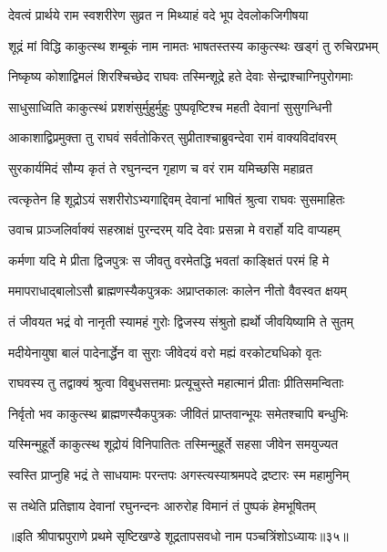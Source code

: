\twolineshloka
{देवत्वं प्रार्थये राम स्वशरीरेण सुव्रत}
{न मिथ्याहं वदे भूप देवलोकजिगीषया}%

\twolineshloka
{शूद्रं मां विद्धि काकुत्स्थ शम्बूकं नाम नामतः}
{भाषतस्तस्य काकुत्स्थः खड्गं तु रुचिरप्रभम्}%

\twolineshloka
{निष्कृष्य कोशाद्विमलं शिरश्चिच्छेद राघवः}
{तस्मिन्शूद्रे हते देवाः सेन्द्राश्चाग्निपुरोगमाः}%

\twolineshloka
{साधुसाध्विति काकुत्स्थं प्रशशंसुर्मुहुर्मुहुः}
{पुष्पवृष्टिश्च महती देवानां सुसुगन्धिनी}%

\twolineshloka
{आकाशाद्विप्रमुक्ता तु राघवं सर्वतोकिरत्}
{सुप्रीताश्चाब्रुवन्देवा रामं वाक्यविदांवरम्}%

\twolineshloka
{सुरकार्यमिदं सौम्य कृतं ते रघुनन्दन}
{गृहाण च वरं राम यमिच्छसि महाव्रत}%

\twolineshloka
{त्वत्कृतेन हि शूद्रोऽयं सशरीरोऽभ्यगाद्दिवम्}
{देवानां भाषितं श्रुत्वा राघवः सुसमाहितः}%

\twolineshloka
{उवाच प्राञ्जलिर्वाक्यं सहस्राक्षं पुरन्दरम्}
{यदि देवाः प्रसन्ना मे वरार्हो यदि वाप्यहम्}%

\twolineshloka
{कर्मणा यदि मे प्रीता द्विजपुत्रः स जीवतु}
{वरमेतद्धि भवतां काङ्क्षितं परमं हि मे}%

\twolineshloka
{ममापराधाद्बालोऽसौ ब्राह्मणस्यैकपुत्रकः}
{अप्राप्तकालः कालेन नीतो वैवस्वत क्षयम्}%

\twolineshloka
{तं जीवयत भद्रं वो नानृती स्यामहं गुरोः}
{द्विजस्य संश्रुतो ह्यर्थो जीवयिष्यामि ते सुतम्}%

\twolineshloka
{मदीयेनायुषा बालं पादेनार्द्धेन वा सुराः}
{जीवेदयं वरो मह्यं वरकोट्यधिको वृतः}%

\twolineshloka
{राघवस्य तु तद्वाक्यं श्रुत्वा विबुधसत्तमाः}
{प्रत्यूचुस्ते महात्मानं प्रीताः प्रीतिसमन्विताः}%

\twolineshloka
{निर्वृतो भव काकुत्स्थ ब्राह्मणस्यैकपुत्रकः}
{जीवितं प्राप्तवान्भूयः समेतश्चापि बन्धुभिः}%

\twolineshloka
{यस्मिन्मुहूर्ते काकुत्स्थ शूद्रोयं विनिपातितः}
{तस्मिन्मुहूर्ते सहसा जीवेन समयुज्यत}%

\twolineshloka
{स्वस्ति प्राप्नुहि भद्रं ते साधयामः परन्तपः}
{अगस्त्यस्याश्रमपदे द्रष्टारः स्म महामुनिम्}%

\twolineshloka
{स तथेति प्रतिज्ञाय देवानां रघुनन्दनः}
{आरुरोह विमानं तं पुष्पकं हेमभूषितम्}%

{॥इति श्रीपाद्मपुराणे प्रथमे सृष्टिखण्डे शूद्रतापसवधो नाम पञ्चत्रिंशोऽध्यायः॥३५॥}
